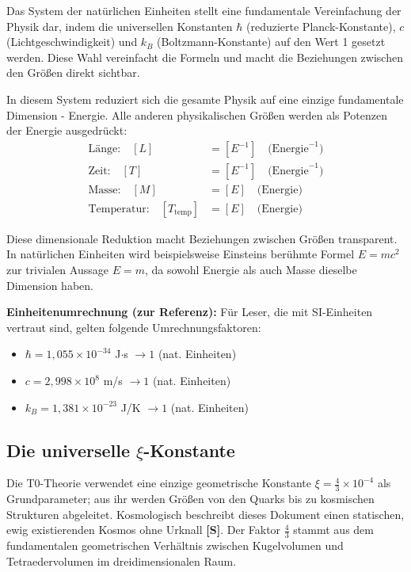 	Das System der natürlichen Einheiten stellt eine fundamentale Vereinfachung der Physik dar, indem die universellen Konstanten $\hbar$ (reduzierte Planck-Konstante), $c$ (Lichtgeschwindigkeit) und $k_B$ (Boltzmann-Konstante) auf den Wert 1 gesetzt werden. Diese Wahl vereinfacht die Formeln und macht die Beziehungen zwischen den Größ{}en direkt sichtbar.
	
	In diesem System reduziert sich die gesamte Physik auf eine einzige fundamentale Dimension - Energie. Alle anderen physikalischen Größ{}en werden als Potenzen der Energie ausgedrückt:
	\begin{align}
		\text{Länge:} \quad [L] &= [E^{-1}] \quad \text{(Energie}^{-1}\text{)} \\
		\text{Zeit:} \quad [T] &= [E^{-1}] \quad \text{(Energie}^{-1}\text{)} \\
		\text{Masse:} \quad [M] &= [E] \quad \text{(Energie)} \\
		\text{Temperatur:} \quad [T_{\text{temp}}] &= [E] \quad \text{(Energie)}
	\end{align}
	
	Diese dimensionale Reduktion macht Beziehungen zwischen Größ{}en transparent. In natürlichen Einheiten wird beispielsweise Einsteins berühmte Formel $E = mc^2$ zur trivialen Aussage $E = m$, da sowohl Energie als auch Masse dieselbe Dimension haben.
	
	\textbf{Einheitenumrechnung (zur Referenz):}
	Für Leser, die mit SI-Einheiten vertraut sind, gelten folgende Umrechnungsfaktoren:
	\begin{itemize}
		\item $\hbar = 1{,}055 \times 10^{-34}$ J$\cdot$s $\rightarrow 1$ (nat. Einheiten)
		\item $c = 2{,}998 \times 10^8$ m/s $\rightarrow 1$ (nat. Einheiten)  
		\item $k_B = 1{,}381 \times 10^{-23}$ J/K $\rightarrow 1$ (nat. Einheiten)
	\end{itemize}
	
	\subsection{Die universelle $\xi$-Konstante}
	
	\begin{important}[Kernaussage]
		Die T0-Theorie verwendet eine einzige geometrische Konstante $\xi = \frac{4}{3} \times 10^{-4}$ als Grundparameter; aus ihr werden Größ{}en von den Quarks bis zu kosmischen Strukturen abgeleitet. Kosmologisch beschreibt dieses Dokument einen statischen, ewig existierenden Kosmos ohne Urknall \textbf{[S]}. Der Faktor $\frac{4}{3}$ stammt aus dem fundamentalen geometrischen Verhältnis zwischen Kugelvolumen und Tetraedervolumen im dreidimensionalen Raum.
	\end{important}
	
